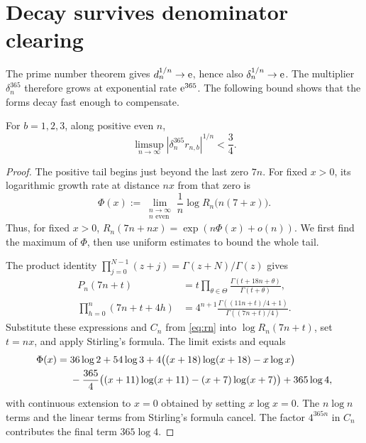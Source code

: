 \section{Decay survives denominator clearing}\label{sec:decay}

The prime number theorem gives $d_n^{1/n}\to\mathrm e$, hence also
$\delta_n^{1/n}\to\mathrm e$. The multiplier $\delta_n^{365}$ therefore grows
at exponential rate $\mathrm e^{365}$. The following bound shows that the
forms decay fast enough to compensate.

\begin{proposition}\label{prop:decay}
For $b=1,2,3$, along positive even $n$,
\[
 \limsup_{n\to\infty}|\delta_n^{365}r_{n,b}|^{1/n}<\frac34.
\]
\end{proposition}

\begin{proof}
The positive tail begins just beyond the last zero $7n$. For fixed
$x>0$, its logarithmic growth rate at distance $nx$ from that zero is
\[
 \Phi(x):=\lim_{\substack{n\to\infty\\n\text{ even}}}
                 \frac1n\log R_n\bigl(n(7+x)\bigr).
\]
Thus, for fixed $x>0$, $R_n(7n+nx)=\exp(n\Phi(x)+o(n))$.
We first find the maximum of $\Phi$, then use uniform estimates to
bound the whole tail.

The product identity
$\prod_{j=0}^{N-1}(z+j)=\Gamma(z+N)/\Gamma(z)$ gives
\begin{align*}
 P_n(7n+t)
   &=t\prod_{\theta\in\Theta}
          \frac{\Gamma(t+18n+\theta)}{\Gamma(t+\theta)},\\
 \prod_{h=0}^{n}(7n+t+4h)
   &=4^{n+1}\frac{\Gamma((11n+t)/4+1)}{\Gamma((7n+t)/4)}.
\end{align*}
Substitute these expressions and $C_n$ from \eqref{eq:rn} into
$\log R_n(7n+t)$, set $t=nx$, and apply Stirling's formula. The limit
exists and equals
\begin{align}
 \Phi(x)={}&36\log2+54\log3
     +4\bigl((x+18)\log(x+18)-x\log x\bigr)\notag\\
 &-\frac{365}{4}\bigl((x+11)\log(x+11)-(x+7)\log(x+7)\bigr)
     +365\log4,\label{eq:profile}
\end{align}
with continuous extension to $x=0$ obtained by setting $x\log x=0$.
The $n\log n$ terms and the linear terms from Stirling's formula cancel.
The factor $4^{365n}$ in $C_n$ contributes the final term $365\log4$.


\end{proof}
